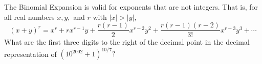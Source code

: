 The Binomial Expansion is valid for exponents that are not integers.  That is, for all real numbers $ x, y,$ and $ r$ with $ |x| > |y|,$
\[ (x + y)^r = x^r + rx^{r - 1}y + \frac {r(r - 1)}2x^{r - 2}y^2 + \frac {r(r - 1)(r - 2)}{3!}x^{r - 3}y^3 + \cdots
\]
What are the first three digits to the right of the decimal point in the decimal representation of $ \left(10^{2002} + 1\right)^{10/7}?$